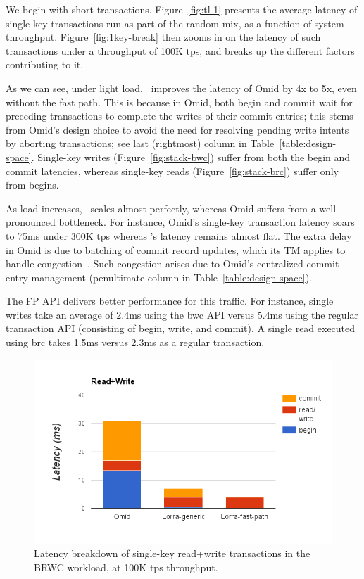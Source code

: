 We begin with short transactions. 
Figure~\ref{fig:tl-1} presents the average latency of single-key transactions run as part of the random mix,
as a function of {system} throughput.
Figure~\ref{fig:1key-break} then zooms in on the latency of such transactions under a throughput of 100K tps,
and breaks up the different factors contributing to it. 

As we can see, under light load, \sys\ improves the latency of Omid by 4x to 5x, even without the fast path.
This is because in Omid, both begin and commit wait for preceding transactions to complete the writes of 
their commit entries; this stems from Omid's design choice to avoid the need for resolving pending write intents
by aborting transactions; see last (rightmost) column in Table~\ref{table:design-space}. 
Single-key writes (Figure~\ref{fig:stack-bwc})
suffer from both the begin and commit latencies, whereas single-key reads (Figure~\ref{fig:stack-brc}) 
suffer only from begins. 

As load increases, \sys\ scales almost perfectly, whereas Omid suffers from a well-pronounced 
bottleneck. For instance, Omid's single-key transaction latency soars to 75ms under 300K tps whereas
{\sys}'s latency remains almost flat. The extra delay in Omid is due to batching of commit record updates, 
which its TM applies to handle congestion~\cite{Omid2017}. Such congestion arises due to Omid's centralized 
commit entry management (penultimate column in Table~\ref{table:design-space}).

The FP API delivers better performance for this traffic. For instance, single writes take an average of 2.4ms using 
the {\code bwc} API versus 5.4ms using the regular transaction API (consisting of begin, write, and commit). 
A single read executed using {\code brc} takes 1.5ms versus 2.3ms as a regular transaction. 

\begin{figure}[htb]
\includegraphics[width=.45\textwidth]{figs/stack-br-wc.png}
\caption{Latency breakdown of single-key read+write transactions in the BRWC workload,
at 100K tps throughput.}
\label{fig:rmw}
\end{figure}

